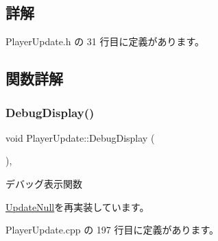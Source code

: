 \subsection{詳解}


 Player\+Update.\+h の 31 行目に定義があります。



\subsection{関数詳解}
\mbox{\label{class_player_update_ac15fd0faf356c6e66f6c62c2b6b8d3ac}} 
\subsubsection{\texorpdfstring{Debug\+Display()}{DebugDisplay()}}
{\footnotesize\ttfamily void Player\+Update\+::\+Debug\+Display (\begin{DoxyParamCaption}{ }\end{DoxyParamCaption})\hspace{0.3cm}{\ttfamily [override]}, {\ttfamily [virtual]}}



デバッグ表示関数 



\mbox{\hyperlink{class_update_null_a77aee1e614cf6dafe4f9af58b2205e4b}{Update\+Null}}を再実装しています。



 Player\+Update.\+cpp の 197 行目に定義があります。

